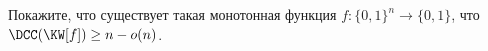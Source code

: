 Покажите, что существует такая монотонная функция $f\colon \{0, 1\}^n \to \{0, 1\}$, что 
$\DCC(\KW[f]) \ge n - o(n)$. 